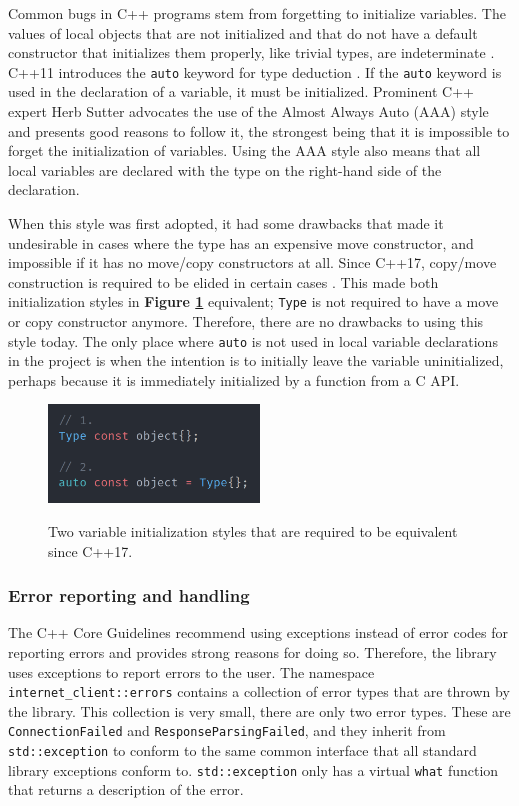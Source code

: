 \documentclass[12pt, a4paper]{article}
\begin{document}
Common bugs in C++ programs stem from forgetting to initialize variables. The values of local objects that are not initialized and that do not have a default constructor that initializes them properly, like trivial types, are indeterminate \parencite{CppDefaultInitialization}. C++11 introduces the \texttt{auto} keyword for type deduction \parencite{CppAuto}. If the \texttt{auto} keyword is used in the declaration of a variable, it must be initialized. Prominent C++ expert Herb Sutter \parencite*{AlmostAlwaysAuto} advocates the use of the Almost Always Auto (AAA) style and presents good reasons to follow it, the strongest being that it is impossible to forget the initialization of variables. Using the AAA style also means that all local variables are declared with the type on the right-hand side of the declaration. 

When this style was first adopted, it had some drawbacks that made it undesirable in cases where the type has an expensive move constructor, and impossible if it has no move/copy constructors at all. Since C++17, copy/move construction is required to be elided in certain cases \parencite{CppCopyElision}. This made both initialization styles in \textbf{Figure \ref{fig:auto_type_deduction}} equivalent; \texttt{Type} is not required to have a move or copy constructor anymore. Therefore, there are no drawbacks to using this style today. The only place where \texttt{auto} is not used in local variable declarations in the project is when the intention is to initially leave the variable uninitialized, perhaps because it is immediately initialized by a function from a C API.

\begin{figure}[ht]
	\centering
	\caption{Two variable initialization styles that are required to be equivalent since C++17.}
	\includegraphics[width=0.5\textwidth]{auto_type_deduction}
	\label{fig:auto_type_deduction}
\end{figure}

\subsubsection{Error reporting and handling}
The C++ Core Guidelines \parencite{CppCoreGuidelines} recommend using exceptions instead of error codes for reporting errors and provides strong reasons for doing so. Therefore, the library uses exceptions to report errors to the user. The namespace \texttt{internet\_client::errors} contains a collection of error types that are thrown by the library. This collection is very small, there are only two error types. These are \texttt{ConnectionFailed} and \texttt{ResponseParsingFailed}, and they inherit from \texttt{std::exception} to conform to the same common interface that all standard library exceptions conform to. \texttt{std::exception} only has a virtual \texttt{what} function that returns a description of the error. 
\end{document}
